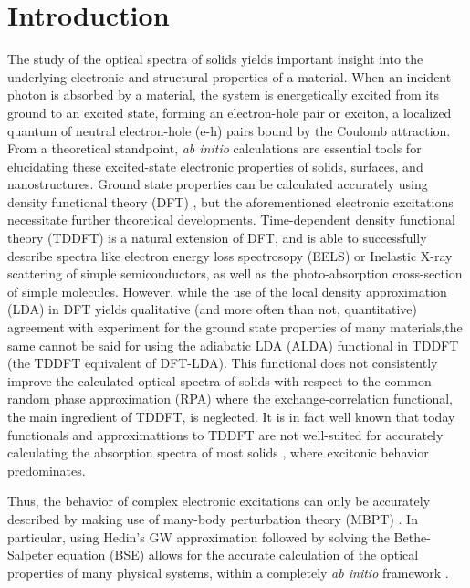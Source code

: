 \documentclass[aps,prb,10pt,showpacs,superscriptaddress,twocolumn,notitlepage]{revtex4-1}
\begin{document}
\section{Introduction}\label{sec:intro}

The study of the optical spectra of solids yields important insight into the
underlying electronic and structural properties of a material. When an incident
photon is absorbed by a material, the system is energetically excited from its
ground to an excited state, forming an electron-hole pair or exciton, a
localized quantum of neutral electron-hole (e-h) pairs bound by the Coulomb
attraction. From a theoretical standpoint, \emph{ab initio} calculations are
essential tools for elucidating these excited-state electronic properties of
solids, surfaces, and nanostructures. Ground state properties can be calculated
accurately using density functional theory (DFT) \cite{hohenbergPR64, kohnPR65},
but the aforementioned electronic excitations necessitate further theoretical
developments. Time-dependent density functional theory (TDDFT) \cite{rungePRL84}
is a natural extension of DFT, and is able to successfully describe spectra like
electron energy loss spectrosopy (EELS) or Inelastic X-ray scattering of simple
semiconductors, as well as the photo-absorption cross-section of simple
molecules. However, while the use of the local density approximation (LDA) in
DFT yields qualitative (and more often than not, quantitative) agreement with
experiment for the ground state properties of many materials,the same cannot be
said for using the adiabatic LDA (ALDA) functional \cite{rungePRL84} in TDDFT
(the TDDFT equivalent of DFT-LDA). This functional does not consistently improve
the calculated optical spectra of solids with respect to the common random phase
approximation (RPA) where the exchange-correlation functional, the main
ingredient of TDDFT, is neglected. It is in fact well known \cite{onidaRMP02}
that today functionals and approximattions to TDDFT are not well-suited for
accurately calculating the absorption spectra of most solids
\cite{gavrilenkoPRB97, onidaRMP02}, where excitonic behavior predominates.

Thus, the behavior of complex electronic excitations can only be accurately
described by making use of many-body perturbation theory (MBPT)
\cite{fetterbook72}. In particular, using Hedin's GW approximation
\cite{hedinPR65} followed by solving the Bethe-Salpeter equation (BSE)
\cite{salpeterPR51, abrikosovbook65, shamPR66, hankePRB80, onidaRMP02} allows
for the accurate calculation of the optical properties of many physical systems,
within a completely \emph{ab initio} framework \cite{shirleyPRL93,
albrechtPRB97, benedictPRL98, benedictPRB99, benedictPRB03, palummoJPCM04,
sittPRA07, ramosPRB08, roccaJCP10, garciaJCP11, gruningCMS11, gattiPRB13}.
\end{document}
